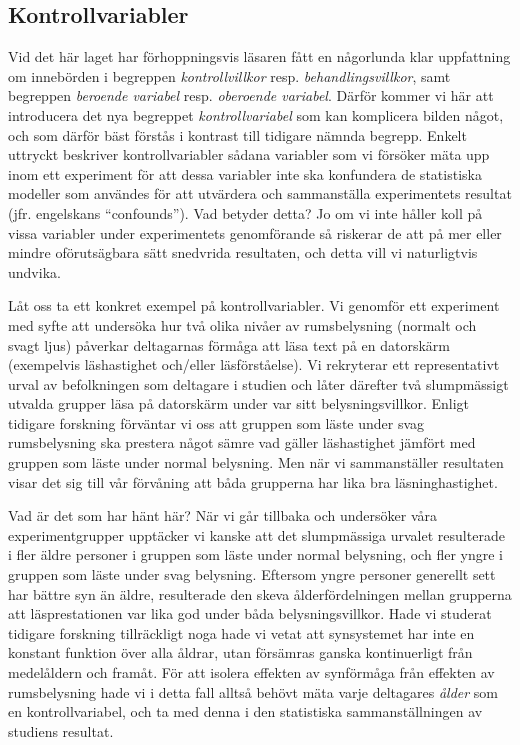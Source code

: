 \documentclass[
]{book}
\begin{document}
\hypertarget{sub07.4.4}{%
\subsection{Kontrollvariabler}\label{sub07.4.4}}

Vid det här laget har förhoppningsvis läsaren fått en någorlunda klar uppfattning om innebörden i begreppen \emph{kontrollvillkor} resp. \emph{behandlingsvillkor}, samt begreppen \emph{beroende variabel} resp. \emph{oberoende variabel}. Därför kommer vi här att introducera det nya begreppet \emph{kontrollvariabel} som kan komplicera bilden något, och som därför bäst förstås i kontrast till tidigare nämnda begrepp. Enkelt uttryckt beskriver kontrollvariabler sådana variabler som vi försöker mäta upp inom ett experiment för att dessa variabler inte ska konfundera de statistiska modeller som användes för att utvärdera och sammanställa experimentets resultat (jfr. engelskans ``confounds''). Vad betyder detta? Jo om vi inte håller koll på vissa variabler under experimentets genomförande så riskerar de att på mer eller mindre oförutsägbara sätt snedvrida resultaten, och detta vill vi naturligtvis undvika.

Låt oss ta ett konkret exempel på kontrollvariabler. Vi genomför ett experiment med syfte att undersöka hur två olika nivåer av rumsbelysning (normalt och svagt ljus) påverkar deltagarnas förmåga att läsa text på en datorskärm (exempelvis läshastighet och/eller läsförståelse). Vi rekryterar ett representativt urval av befolkningen som deltagare i studien och låter därefter två slumpmässigt utvalda grupper läsa på datorskärm under var sitt belysningsvillkor. Enligt tidigare forskning förväntar vi oss att gruppen som läste under svag rumsbelysning ska prestera något sämre vad gäller läshastighet jämfört med gruppen som läste under normal belysning. Men när vi sammanställer resultaten visar det sig till vår förvåning att båda grupperna har lika bra läsninghastighet.

Vad är det som har hänt här? När vi går tillbaka och undersöker våra experimentgrupper upptäcker vi kanske att det slumpmässiga urvalet resulterade i fler äldre personer i gruppen som läste under normal belysning, och fler yngre i gruppen som läste under svag belysning. Eftersom yngre personer generellt sett har bättre syn än äldre, resulterade den skeva ålderfördelningen mellan grupperna att läsprestationen var lika god under båda belysningsvillkor. Hade vi studerat tidigare forskning tillräckligt noga hade vi vetat att synsystemet har inte en konstant funktion över alla åldrar, utan försämras ganska kontinuerligt från medelåldern och framåt. För att isolera effekten av synförmåga från effekten av rumsbelysning hade vi i detta fall alltså behövt mäta varje deltagares \emph{ålder} som en kontrollvariabel, och ta med denna i den statistiska sammanställningen av studiens resultat.
\end{document}
